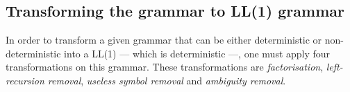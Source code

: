 \documentclass[a4paper,11pt]{article}
\begin{document}
  \begin{center}
  \end{center}
  
  \subsection{Transforming the grammar to LL(1) grammar}
    In order to transform a given grammar that can be either deterministic or non-deterministic into a LL(1) --- which is deterministic ---, one must apply four transformations on this grammar. These transformations are \textit{factorisation}, \textit{left-recursion removal}, \textit{useless symbol removal} and \textit{ambiguity removal}.
    
\end{document}
